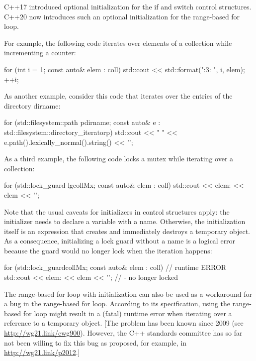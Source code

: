 
C++17 introduced optional initialization for the if and switch control structures. C++20 now introduces such an optional initialization for the range-based for loop.

For example, the following code iterates over elements of a collection while incrementing a counter:

\begin{cpp}
for (int i = 1; const auto& elem : coll) {
	std::cout << std::format("{:3}: {}\n", i, elem);
	++i;
}
\end{cpp}

As another example, consider this code that iterates over the entries of the directory dirname:

\begin{cpp}
for (std::filesystem::path p{dirname};
const auto& e : std::filesystem::directory_iterator{p}) {
	std::cout << " " << e.path().lexically_normal().string() << '\n';
}
\end{cpp}

As a third example, the following code locks a mutex while iterating over a collection:

\begin{cpp}
for (std::lock_guard lg{collMx}; const auto& elem : coll) {
	std::cout << elem: << elem << '\n';
}
\end{cpp}

Note that the usual caveats for initializers in control structures apply: the initializer needs to declare a variable with a name. Otherwise, the initialization itself is an expression that creates and immediately destroys a temporary object. As a consequence, initializing a lock guard without a name is a logical error because the guard would no longer lock when the iteration happens:

\begin{cpp}
for (std::lock_guard{collMx}; const auto& elem : coll) { // runtime ERROR
	std::cout << elem: << elem << '\n'; // - no longer locked
}
\end{cpp}

The range-based for loop with initialization can also be used as a workaround for a bug in the range-based for loop. According to its specification, using the range-based for loop might result in a (fatal) runtime error when iterating over a reference to a temporary object. [The problem has been known since 2009 (see \url{http://wg21.link/cwg900}). However, the C++ standards committee has so far not been willing to fix this bug as proposed, for example, in \url{http://wg21.link/p2012}.]

